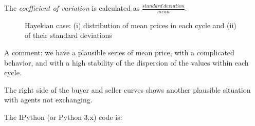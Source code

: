 \documentclass[12pt]{report}
\begin{document}
The \emph{coefficient of variation} is calculated as $\frac{standard~deviation}{mean}$.

\begin{figure}[htbp]
\begin{center}
\caption{Hayekian case: (i) distribution of mean prices in each cycle and (ii) of their standard deviations}
\label{output_3_2.png}
\end{center}
\end{figure}

A comment: we have a plausible series of mean price, with a complicated behavior, and with a high stability of the dispersion of the values within each cycle.

The right side of the buyer and seller curves shows another plausible situation with agents not exchanging. 

The IPython (or Python 3.x) code is:
\end{document}

